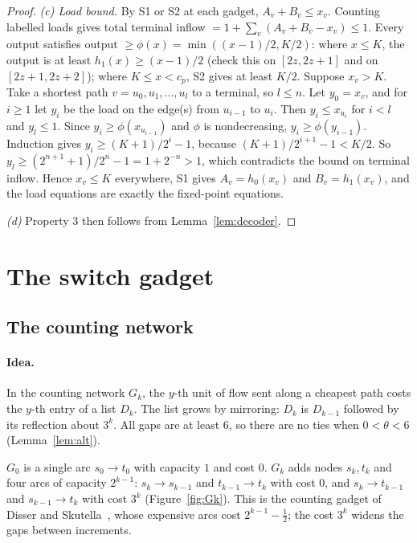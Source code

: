 \begin{proof}
\emph{(c) Load bound.} By S1 or S2 at each gadget, $A_v+B_v\le x_v$. Counting labelled loads gives total
terminal inflow ${}=1+\sum_v(A_v+B_v-x_v)\le1$. Every output satisfies output
${}\ge\phi(x)=\min((x-1)/2,K/2)$: where $x\le K$, the output is at least $h_1(x)\ge(x-1)/2$ (check this
on $[2z,2z+1]$ and on $[2z+1,2z+2]$); where $K\le x<c_p$, S2 gives at least $K/2$. Suppose $x_v>K$. Take
a shortest path $v=u_0,u_1,\dots,u_l$ to a terminal, so $l\le n$. Let $y_0=x_v$, and for $i\ge1$ let
$y_i$ be the load on the edge(s) from $u_{i-1}$ to $u_i$. Then $y_i\le x_{u_i}$ for $i<l$ and
$y_l\le1$. Since $y_i\ge\phi(x_{u_{i-1}})$ and $\phi$ is nondecreasing, $y_i\ge\phi(y_{i-1})$.
Induction gives $y_i\ge(K+1)/2^i-1$, because $(K+1)/2^{i+1}-1<K/2$. So
$y_l\ge(2^{n+1}+1)/2^n-1=1+2^{-n}>1$, which contradicts the bound on terminal inflow. Hence $x_v\le K$
everywhere, S1 gives $A_v=h_0(x_v)$ and $B_v=h_1(x_v)$, and the load equations are exactly the
fixed-point equations.

\emph{(d)} Property 3 then follows from Lemma~\ref{lem:decoder}.
\end{proof}

\section{The switch gadget}\label{sec:ar-gadget}

\subsection{The counting network}

\paragraph{Idea.} In the counting network $G_k$, the $y$-th unit of flow sent along a cheapest path
costs the $y$-th entry of a list $D_k$. The list grows by mirroring: $D_k$ is $D_{k-1}$ followed by its
reflection about $3^k$. All gaps are at least $6$, so there are no ties when $0<\theta<6$ (Lemma~\ref{lem:alt}).

$G_0$ is a single arc $s_0\to t_0$ with capacity $1$ and cost $0$. $G_k$ adds nodes $s_k,t_k$ and four
arcs of capacity $2^{k-1}$: $s_k\to s_{k-1}$ and $t_{k-1}\to t_k$ with cost $0$, and $s_k\to t_{k-1}$
and $s_{k-1}\to t_k$ with cost $3^k$ (Figure~\ref{fig:Gk}). This is the counting gadget of Disser and
Skutella~\cite[\S3.1]{ds15}, whose expensive arcs cost $2^{k-1}-\tfrac12$; the cost $3^k$ widens the gaps
between increments.

